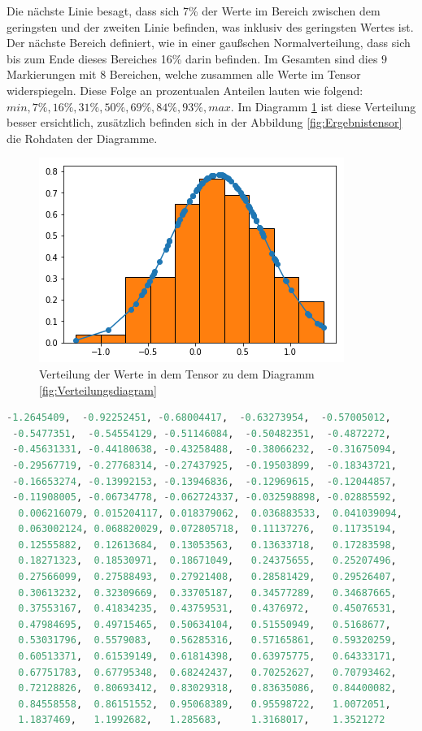 Die nächste Linie besagt, dass sich 7\% der Werte im Bereich zwischen dem geringsten und der zweiten Linie befinden, was inklusiv des geringsten Wertes ist.  
Der nächste Bereich definiert, wie in einer gaußschen Normalverteilung, dass sich bis zum Ende dieses Bereiches 16\% darin befinden. 
Im Gesamten sind dies $9$ Markierungen mit 8 Bereichen, welche zusammen alle Werte im Tensor widerspiegeln. 
Diese Folge an prozentualen Anteilen lauten wie folgend: $min, 7\%, 16\%, 31\%, 50\%, 69\%, 84\%, 93\%, max$. 
Im Diagramm \ref{fig:VerteilungsdiagrammPython} ist diese Verteilung besser ersichtlich, zusätzlich befinden sich in der Abbildung \ref{fig:Ergebnistensor} die Rohdaten der Diagramme. 
\begin{figure}
	\centering
	\includegraphics[scale=0.6]{images/gaussian.png}
	\caption{Verteilung der Werte in dem Tensor zu dem Diagramm \ref{fig:Verteilungsdiagram}}
	\label{fig:VerteilungsdiagrammPython}
\end{figure}
\begin{lstlisting}[caption={Sortierter Ergebnistensor zum Verteilungsdiagramm \ref{fig:VerteilungsdiagrammPython} und \ref{fig:Verteilungsdiagram} im Schritt $0$},label=fig:Ergebnistensor,captionpos=b,language=Python]
 -1.2645409,  -0.92252451, -0.68004417,  -0.63273954,  -0.57005012, 
 -0.5477351,  -0.54554129, -0.51146084,  -0.50482351,  -0.4872272, 
 -0.45631331, -0.44180638, -0.43258488,  -0.38066232,  -0.31675094, 
 -0.29567719, -0.27768314, -0.27437925,  -0.19503899,  -0.18343721, 
 -0.16653274, -0.13992153, -0.13946836,  -0.12969615,  -0.12044857, 
 -0.11908005, -0.06734778, -0.062724337, -0.032598898, -0.02885592, 
  0.006216079, 0.015204117, 0.018379062,  0.036883533,  0.041039094, 
  0.063002124, 0.068820029, 0.072805718,  0.11137276,   0.11735194, 
  0.12555882,  0.12613684,  0.13053563,   0.13633718,   0.17283598, 
  0.18271323,  0.18530971,  0.18671049,   0.24375655,   0.25207496, 
  0.27566099,  0.27588493,  0.27921408,   0.28581429,   0.29526407, 
  0.30613232,  0.32309669,  0.33705187,   0.34577289,   0.34687665, 
  0.37553167,  0.41834235,  0.43759531,   0.4376972,    0.45076531, 
  0.47984695,  0.49715465,  0.50634104,   0.51550949,   0.5168677, 
  0.53031796,  0.5579083,   0.56285316,   0.57165861,   0.59320259, 
  0.60513371,  0.61539149,  0.61814398,   0.63975775,   0.64333171, 
  0.67751783,  0.67795348,  0.68242437,   0.70252627,   0.70793462, 
  0.72128826,  0.80693412,  0.83029318,   0.83635086,   0.84400082, 
  0.84558558,  0.86151552,  0.95068389,   0.95598722,   1.0072051, 
  1.1837469,   1.1992682,   1.285683,     1.3168017,    1.3521272
\end{lstlisting}


